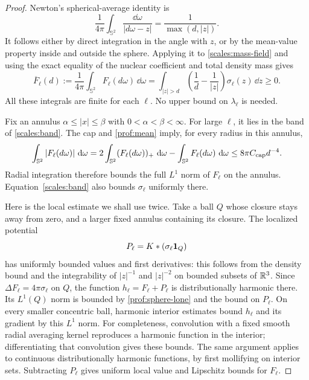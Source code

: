 \begin{proof}
Newton's spherical-average identity is
\[
 \frac1{4\pi}\int_{\mathbb S^2}\frac{\dd\omega}{|d\omega-z|}
 =\frac1{\max(d,|z|)}.
\]
It follows either by direct integration in the angle with $z$, or by
the mean-value property inside and outside the sphere.  Applying it
to \eqref{scales:mass-field} and using the exact equality of the nuclear
coefficient and total density mass gives
\begin{equation}
\label{prof:mean}
 \overline F_\ell(d):=
 \frac1{4\pi}\int_{\mathbb S^2}F_\ell(d\omega)\,\dd\omega
 =\int_{|z|>d}\left(\frac1d-\frac1{|z|}\right)
                    \sigma_\ell(z)\,\dd z\ge0.
\end{equation}
All these integrals are finite for each $\ell$.  No upper bound on
$\lambda_\ell$ is needed.

Fix an annulus $\alpha\le |x|\le\beta$ with $0<\alpha<\beta<\infty$.
For large $\ell$, it lies in the band of \eqref{scales:band}.  The cap
and \eqref{prof:mean} imply, for every radius in this annulus,
\begin{equation}
\label{prof:sphere-lone}
 \int_{\mathbb S^2}|F_\ell(d\omega)|\,\,\mathrm d\omega
 =2\int_{\mathbb S^2}(F_\ell(d\omega))_+\,\,\mathrm d\omega
    -\int_{\mathbb S^2}F_\ell(d\omega)\,\,\mathrm d\omega
 \le 8\pi C_{\rm cap}d^{-4}.
\end{equation}
Radial integration therefore bounds the full $L^1$ norm of $F_\ell$
on the annulus.  Equation~\eqref{scales:band} also bounds
$\sigma_\ell$ uniformly there.

Here is the local estimate we shall use twice.  Take a ball $Q$ whose
closure stays away from zero, and a larger fixed annulus containing
its closure.  The localized potential
\[
 P_\ell=K*(\sigma_\ell\mathbf1_Q)
\]
has uniformly bounded values and first derivatives: this follows
from the density bound and the integrability of $|z|^{-1}$ and
$|z|^{-2}$ on bounded subsets of $\mathbb R^3$.  Since
$\Delta F_\ell=4\pi\sigma_\ell$ on $Q$, the function
$h_\ell=F_\ell+P_\ell$ is distributionally harmonic there.  Its
$L^1(Q)$ norm is bounded by \eqref{prof:sphere-lone} and the bound on
$P_\ell$.  On every smaller concentric ball, harmonic interior
estimates bound $h_\ell$ and its gradient by this $L^1$ norm.  For
completeness, convolution with a fixed smooth radial averaging kernel
reproduces a harmonic function in the interior; differentiating that
convolution gives these bounds.  The same argument applies to
continuous distributionally harmonic functions, by first mollifying
on interior sets.  Subtracting $P_\ell$ gives uniform local value and
Lipschitz bounds for $F_\ell$.


\end{proof}
